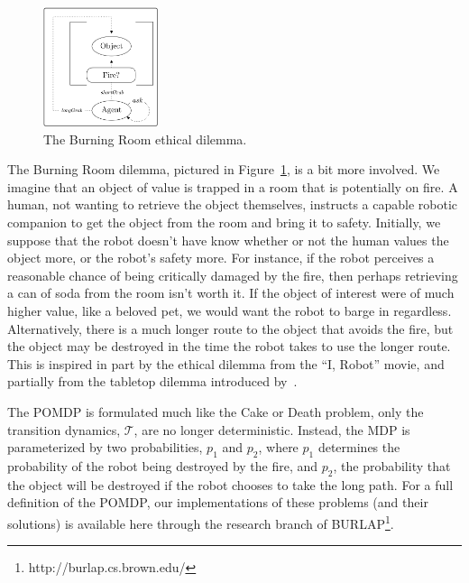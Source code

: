 \documentclass[11pt]{article}
\begin{document}
\begin{figure}
\centering
\includegraphics[width=0.30\textwidth]{figures/burning_room.png}
\caption{The Burning Room ethical dilemma.}
\label{fig:burning_room}
\end{figure}

The Burning Room dilemma, pictured in Figure~\ref{fig:burning_room}, is a bit more involved. We imagine that an object of value is trapped in a room that is potentially on fire. A human, not wanting to retrieve the object themselves, instructs a capable robotic companion to get the object from the room and bring it to safety. Initially, we suppose that the robot doesn't have know whether or not the human values the object more, or the robot's safety more. For instance, if the robot perceives a reasonable chance of being critically damaged by the fire, then perhaps retrieving a can of soda from the room isn't worth it. If the object of interest were of much higher value, like a beloved pet, we would want the robot to barge in regardless. Alternatively, there is a much longer route to the object that avoids the fire, but the object may be destroyed in the time the robot takes to use the longer route. This is inspired in part by the ethical dilemma from the ``I, Robot'' movie, and partially from the tabletop dilemma introduced by~\cite{briggs2015sorry}.

The POMDP is formulated much like the Cake or Death problem, only the transition dynamics, $\mathcal{T}$, are no longer deterministic. Instead, the MDP is parameterized by two probabilities, $p_1$ and $p_2$, where $p_1$ determines the probability of the robot being destroyed by the fire, and $p_2$, the probability that the object will be destroyed if the robot chooses to take the long path. For a full definition of the POMDP, our implementations of these problems (and their solutions) is available here through the research branch of BURLAP\footnote{http://burlap.cs.brown.edu/}.



\end{document}

